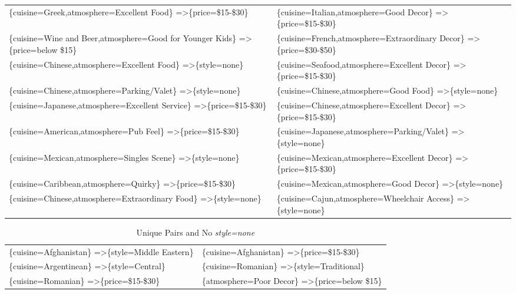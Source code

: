 \documentclass[letterpaper,10pt]{article}
\begin{document}
\begin{appendices}
\begin{table}[h]
\begin{adjustbox}{max width=\textwidth}
\begin{tabular}{ll}
\{cuisine=Greek,atmosphere=Excellent Food\} =\textgreater \{price=\$15-\$30\} & \{cuisine=Italian,atmosphere=Good Decor\} =\textgreater \{price=\$15-\$30\} \\
\{cuisine=Wine and Beer,atmosphere=Good for Younger Kids\} =\textgreater \{price=below \$15\} & \{cuisine=French,atmosphere=Extraordinary Decor\} =\textgreater \{price=\$30-\$50\} \\
\{cuisine=Chinese,atmosphere=Excellent Food\} =\textgreater \{style=none\} & \{cuisine=Seafood,atmosphere=Excellent Decor\} =\textgreater \{price=\$15-\$30\} \\
\{cuisine=Chinese,atmosphere=Parking/Valet\} =\textgreater \{style=none\} & \{cuisine=Chinese,atmosphere=Good Food\} =\textgreater \{style=none\} \\
\{cuisine=Japanese,atmosphere=Excellent Service\} =\textgreater \{price=\$15-\$30\} & \{cuisine=Chinese,atmosphere=Excellent Decor\} =\textgreater \{price=\$15-\$30\} \\
\{cuisine=American,atmosphere=Pub Feel\} =\textgreater \{price=\$15-\$30\} & \{cuisine=Japanese,atmosphere=Parking/Valet\} =\textgreater \{style=none\} \\
\{cuisine=Mexican,atmosphere=Singles Scene\} =\textgreater \{style=none\} & \{cuisine=Mexican,atmosphere=Excellent Decor\} =\textgreater \{price=\$15-\$30\} \\
\{cuisine=Caribbean,atmosphere=Quirky\} =\textgreater \{price=\$15-\$30\} & \{cuisine=Mexican,atmosphere=Good Decor\} =\textgreater \{style=none\} \\
\{cuisine=Chinese,atmosphere=Extraordinary Food\} =\textgreater \{style=none\} & \{cuisine=Cajun,atmosphere=Wheelchair Access\} =\textgreater \{style=none\} \\
\end{tabular}
\end{adjustbox}
\end{table}
\begin{table}[h]
\caption*{Unique Pairs and No \textit{style=none}}
\begin{adjustbox}{max width=\textwidth}
\begin{tabular}{ll}
\{cuisine=Afghanistan\} =\textgreater \{style=Middle Eastern\} & \{cuisine=Afghanistan\} =\textgreater \{price=\$15-\$30\} \\
\{cuisine=Argentinean\} =\textgreater \{style=Central\} & \{cuisine=Romanian\} =\textgreater \{style=Traditional\} \\
\{cuisine=Romanian\} =\textgreater \{price=\$15-\$30\} & \{atmosphere=Poor Decor\} =\textgreater \{price=below \$15\} \\

\end{tabular}
\end{adjustbox}
\end{table}
\end{appendices}
\end{document}
